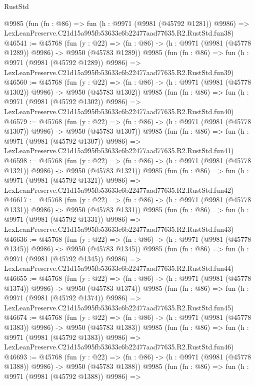 \begin{lexlean}{RustStd}
\begin{coremodule}
    @9985
    (fun (fn : @86) =>
    fun (h : @9971 (@9981 (@45792 @1281)) @9986) =>
    LexLeanPreserve.C21d15a995fb53633c6b22477aad77635.R2.RustStd.fun38)
@46541 := @45768
    (fun (y : @22) =>
    (fn : @86) -> (h : @9971 (@9981 (@45778 @1289)) @9986) -> @9950 (@45783 @1289))
    @9985
    (fun (fn : @86) =>
    fun (h : @9971 (@9981 (@45792 @1289)) @9986) =>
    LexLeanPreserve.C21d15a995fb53633c6b22477aad77635.R2.RustStd.fun39)
@46560 := @45768
    (fun (y : @22) =>
    (fn : @86) -> (h : @9971 (@9981 (@45778 @1302)) @9986) -> @9950 (@45783 @1302))
    @9985
    (fun (fn : @86) =>
    fun (h : @9971 (@9981 (@45792 @1302)) @9986) =>
    LexLeanPreserve.C21d15a995fb53633c6b22477aad77635.R2.RustStd.fun40)
@46579 := @45768
    (fun (y : @22) =>
    (fn : @86) -> (h : @9971 (@9981 (@45778 @1307)) @9986) -> @9950 (@45783 @1307))
    @9985
    (fun (fn : @86) =>
    fun (h : @9971 (@9981 (@45792 @1307)) @9986) =>
    LexLeanPreserve.C21d15a995fb53633c6b22477aad77635.R2.RustStd.fun41)
@46598 := @45768
    (fun (y : @22) =>
    (fn : @86) -> (h : @9971 (@9981 (@45778 @1321)) @9986) -> @9950 (@45783 @1321))
    @9985
    (fun (fn : @86) =>
    fun (h : @9971 (@9981 (@45792 @1321)) @9986) =>
    LexLeanPreserve.C21d15a995fb53633c6b22477aad77635.R2.RustStd.fun42)
@46617 := @45768
    (fun (y : @22) =>
    (fn : @86) -> (h : @9971 (@9981 (@45778 @1331)) @9986) -> @9950 (@45783 @1331))
    @9985
    (fun (fn : @86) =>
    fun (h : @9971 (@9981 (@45792 @1331)) @9986) =>
    LexLeanPreserve.C21d15a995fb53633c6b22477aad77635.R2.RustStd.fun43)
@46636 := @45768
    (fun (y : @22) =>
    (fn : @86) -> (h : @9971 (@9981 (@45778 @1345)) @9986) -> @9950 (@45783 @1345))
    @9985
    (fun (fn : @86) =>
    fun (h : @9971 (@9981 (@45792 @1345)) @9986) =>
    LexLeanPreserve.C21d15a995fb53633c6b22477aad77635.R2.RustStd.fun44)
@46655 := @45768
    (fun (y : @22) =>
    (fn : @86) -> (h : @9971 (@9981 (@45778 @1374)) @9986) -> @9950 (@45783 @1374))
    @9985
    (fun (fn : @86) =>
    fun (h : @9971 (@9981 (@45792 @1374)) @9986) =>
    LexLeanPreserve.C21d15a995fb53633c6b22477aad77635.R2.RustStd.fun45)
@46674 := @45768
    (fun (y : @22) =>
    (fn : @86) -> (h : @9971 (@9981 (@45778 @1383)) @9986) -> @9950 (@45783 @1383))
    @9985
    (fun (fn : @86) =>
    fun (h : @9971 (@9981 (@45792 @1383)) @9986) =>
    LexLeanPreserve.C21d15a995fb53633c6b22477aad77635.R2.RustStd.fun46)
@46693 := @45768
    (fun (y : @22) =>
    (fn : @86) -> (h : @9971 (@9981 (@45778 @1388)) @9986) -> @9950 (@45783 @1388))
    @9985
    (fun (fn : @86) =>
    fun (h : @9971 (@9981 (@45792 @1388)) @9986) =>

\end{coremodule}
\end{lexlean}
